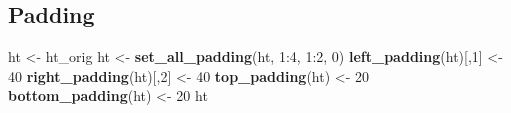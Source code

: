 \documentclass[]{article}
\newenvironment{Shaded}{\begin{snugshade}}{\end{snugshade}}
\newcommand{\KeywordTok}[1]{\textcolor[rgb]{0.13,0.29,0.53}{\textbf{{#1}}}}
\newcommand{\DecValTok}[1]{\textcolor[rgb]{0.00,0.00,0.81}{{#1}}}
\newcommand{\StringTok}[1]{\textcolor[rgb]{0.31,0.60,0.02}{{#1}}}
\newcommand{\NormalTok}[1]{{#1}}
\begin{document}
\FloatBarrier

\subsection{Padding}\label{padding}

\begin{Shaded}
\begin{Highlighting}[]
\NormalTok{ht <-}\StringTok{ }\NormalTok{ht_orig}
\NormalTok{ht <-}\StringTok{ }\KeywordTok{set_all_padding}\NormalTok{(ht, }\DecValTok{1}\NormalTok{:}\DecValTok{4}\NormalTok{, }\DecValTok{1}\NormalTok{:}\DecValTok{2}\NormalTok{, }\DecValTok{0}\NormalTok{)}
\KeywordTok{left_padding}\NormalTok{(ht)[,}\DecValTok{1}\NormalTok{] <-}\StringTok{ }\DecValTok{40}
\KeywordTok{right_padding}\NormalTok{(ht)[,}\DecValTok{2}\NormalTok{] <-}\StringTok{ }\DecValTok{40}
\KeywordTok{top_padding}\NormalTok{(ht) <-}\StringTok{ }\DecValTok{20}
\KeywordTok{bottom_padding}\NormalTok{(ht) <-}\StringTok{ }\DecValTok{20}
\NormalTok{ht}
\end{Highlighting}
\end{Shaded}
\end{document}
